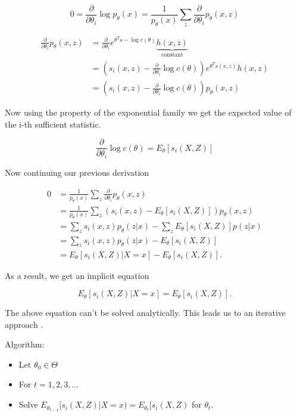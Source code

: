\begin{equation}
    0 = \frac{\partial}{\partial \theta_i} \log p_\theta(x) = \frac{1}{p_\theta(x)} \sum_z \frac{\partial}{\partial \theta_i} p_\theta(x, z)
\end{equation}

\begin{align}
    \frac{\partial}{\partial \theta_i} p_\theta(x, z) &= \frac{\partial}{\partial \theta_i} e^{\theta^T s - \log c(\theta)} \underbrace{h(x,z)}_{\text{constant}} \\
    &= \left(s_i(x,z) - \frac{\partial}{\partial \theta_i} \log c(\theta) \right) e^{\theta^T s(x,z)} h(x,z) \\
    &= \left(s_i(x,z) - \frac{\partial}{\partial \theta_i} \log c(\theta) \right) p_\theta(x, z)
\end{align}

Now using the property of the exponential family  we get the expected value of the i-th sufficient statistic.

\begin{equation}
    \frac{\partial}{\partial \theta_i} \log c(\theta) = E_\theta[s_i(X, Z)]
\end{equation}

Now continuing our previous derivation

\begin{align}
    0 &= \frac{1}{p_\theta(x)} \sum_z \frac{\partial}{\partial \theta_i} p_\theta(x, z) \\
    &= \frac{1}{p_\theta(x)} \sum_z \left( s_i(x,z) - E_\theta[s_i(X, Z)] \right) p_\theta(x, z) \\
    &= \sum_z s_i(x, z) p_\theta(z | x) - \sum_z  E_\theta[s_i(X, Z)] p(z | x) \\
    &= \sum_z s_i(x, z) p_\theta(z | x) - E_\theta[s_i(X, Z)] \\
    &= E_\theta[s_i(X, Z) | X=x] - E_\theta[s_i(X, Z)].
\end{align}

As a result, we get an implicit equation

\begin{equation}
    E_\theta[s_i(X, Z) | X=x] = E_\theta[s_i(X, Z)].
\end{equation}

The above equation can't be solved analytically. This leads us to an iterative approach .

Algorithm:

\begin{itemize}
    \item Let $\theta_0 \in \Theta$
    \item For $t = 1, 2, 3, \dots$
    \item Solve $E_{\theta_{t-1}}[s_i(X,Z) | X=x) = E_{\theta_t}[s_i(X,Z)$ for $\theta_t$.
\end{itemize}

